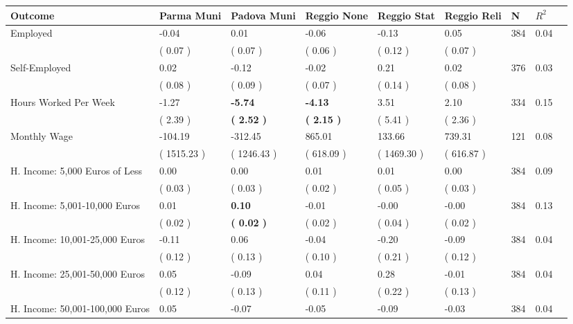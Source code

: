 \begin{tabular}{L{6.2cm} C{1.8cm} C{1.8cm} C{1.8cm} C{1.8cm} C{1.8cm} C{1.8cm} C{0.3cm} C{0.3cm}}
\toprule
 \textbf{Outcome} & \textbf{Parma Muni} & \textbf{Padova Muni} & \textbf{Reggio None} & \textbf{Reggio Stat} & \textbf{Reggio Reli} & \textbf{N} & \textbf{$ R^2$} \\
\midrule
Employed &     -0.04 &      0.01 &     -0.06 &     -0.13 &      0.05  & 384 &       0.04 \\ 
 & (     0.07 ) & (     0.07 ) & (     0.06 ) & (     0.12 ) & (     0.07 )  & \\
Self-Employed &      0.02 &     -0.12 &     -0.02 &      0.21 &      0.02  & 376 &       0.03 \\ 
 & (     0.08 ) & (     0.09 ) & (     0.07 ) & (     0.14 ) & (     0.08 )  & \\
Hours Worked Per Week &     -1.27 & \textbf{    -5.74} & \textbf{    -4.13} &      3.51 &      2.10  & 334 &       0.15 \\ 
 & (     2.39 ) & \textbf{(     2.52 )} & \textbf{(     2.15 )} & (     5.41 ) & (     2.36 )  & \\
Monthly Wage &   -104.19 &   -312.45 &    865.01 &    133.66 &    739.31  & 121 &       0.08 \\ 
 & (  1515.23 ) & (  1246.43 ) & (   618.09 ) & (  1469.30 ) & (   616.87 )  & \\
H. Income: 5,000 Euros of Less &      0.00 &      0.00 &      0.01 &      0.01 &      0.00  & 384 &       0.09 \\ 
 & (     0.03 ) & (     0.03 ) & (     0.02 ) & (     0.05 ) & (     0.03 )  & \\
H. Income: 5,001-10,000 Euros &      0.01 & \textbf{     0.10} &     -0.01 &     -0.00 &     -0.00  & 384 &       0.13 \\ 
 & (     0.02 ) & \textbf{(     0.02 )} & (     0.02 ) & (     0.04 ) & (     0.02 )  & \\
H. Income: 10,001-25,000 Euros &     -0.11 &      0.06 &     -0.04 &     -0.20 &     -0.09  & 384 &       0.04 \\ 
 & (     0.12 ) & (     0.13 ) & (     0.10 ) & (     0.21 ) & (     0.12 )  & \\
H. Income: 25,001-50,000 Euros &      0.05 &     -0.09 &      0.04 &      0.28 &     -0.01  & 384 &       0.04 \\ 
 & (     0.12 ) & (     0.13 ) & (     0.11 ) & (     0.22 ) & (     0.13 )  & \\
H. Income: 50,001-100,000 Euros &      0.05 &     -0.07 &     -0.05 &     -0.09 &     -0.03  & 384 &       0.04 \\ 

\end{tabular}
